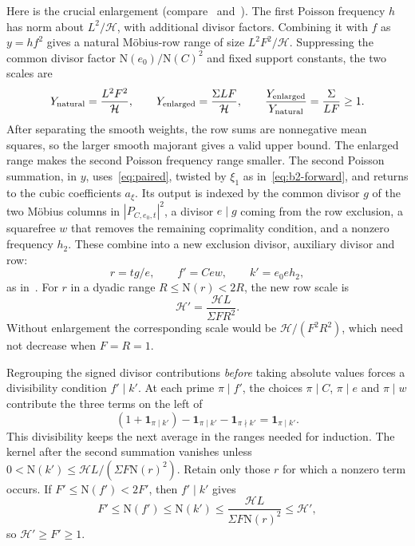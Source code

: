 \documentclass[11pt]{article}
\numberwithin{equation}{section}
\newcommand{\N}{\mathrm N}
\newcommand{\ind}{\mathbf1}
\begin{document}
Here is the crucial enlargement (compare~\cite[Lemma~9]{HB95} and~\cite[Lemma~4.4]{GL}). The first Poisson frequency $h$ has
norm about $L^2/\mathcal H$, with additional divisor factors. Combining
it with $f$ as $y=hf^2$ gives a natural M\"obius-row range of size
$L^2F^2/\mathcal H$. Suppressing the common divisor factor
$\N(e_0)/\N(C)^2$ and fixed support constants, the two scales are
\begin{equation}\label{eq:enlarge}
 Y_{\rm natural}=\frac{L^2F^2}{\mathcal H},\qquad
 Y_{\rm enlarged}=\frac{\Sigma LF}{\mathcal H},\qquad
 \frac{Y_{\rm enlarged}}{Y_{\rm natural}}=\frac{\Sigma}{LF}\ge1.
\end{equation}
After separating the smooth weights, the row sums are nonnegative mean
squares, so the larger smooth majorant gives a valid upper bound.
The enlarged range makes the second Poisson frequency range smaller.
The second Poisson summation, in $y$, uses~\eqref{eq:paired}, twisted by
$\xi_1$ as in~\eqref{eq:b2-forward}, and returns
to the cubic coefficients $a_\xi$. Its output is indexed by the common
divisor $g$ of the two M\"obius columns in $|P_{C,e_0,t}|^2$, a divisor
$e\mid g$ coming from the row exclusion, a squarefree $w$ that removes the
remaining coprimality condition, and a nonzero frequency $h_2$. These
combine into a new exclusion divisor, auxiliary divisor and row:
\begin{equation}\label{eq:d059}
 r=tg/e,\qquad f'=Cew,\qquad k'=e_0eh_2,
\end{equation}
as in~\cite[proof of Lemma~7.3]{OAI1112}. For $r$ in a dyadic range
$R\le\N(r)<2R$, the new row scale is
\begin{equation}\label{eq:Hprime}
 \mathcal H'=\frac{\mathcal HL}{\Sigma FR^2}.
\end{equation}
Without enlargement the corresponding scale would be
$\mathcal H/(F^2R^2)$, which need not decrease when $F=R=1$.

Regrouping the signed divisor contributions \emph{before} taking
absolute values forces a divisibility condition $f'\mid k'$.
At each prime $\pi\mid f'$, the choices $\pi\mid C$, $\pi\mid e$ and
$\pi\mid w$ contribute the three terms on the left of
\begin{equation}\label{eq:localcancel}
 (1+\ind_{\pi\mid k'})-\ind_{\pi\mid k'}
                         -\ind_{\pi\nmid k'}=\ind_{\pi\mid k'}.
\end{equation}
This divisibility keeps the next average in the ranges needed for
induction. The kernel after the second summation vanishes unless
$0<\N(k')\le\mathcal HL/(\Sigma F\N(r)^2)$. Retain only those $r$ for
which a nonzero term occurs. If $F'\le\N(f')<2F'$, then $f'\mid k'$ gives
\begin{equation}\label{eq:retained}
 F'\le\N(f')\le\N(k')\le\frac{\mathcal HL}{\Sigma F\N(r)^2}\le\mathcal H',
\end{equation}
so $\mathcal H'\ge F'\ge1$.
\end{document}
